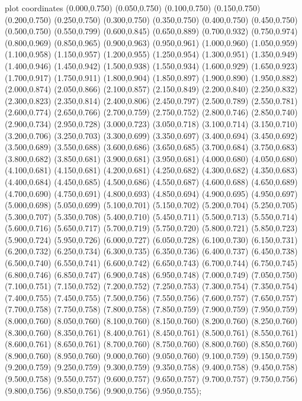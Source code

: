  plot coordinates {(0.000,0.750) (0.050,0.750) (0.100,0.750) (0.150,0.750) (0.200,0.750) (0.250,0.750) (0.300,0.750) (0.350,0.750) (0.400,0.750) (0.450,0.750) (0.500,0.750) (0.550,0.799) (0.600,0.845) (0.650,0.889) (0.700,0.932) (0.750,0.974) (0.800,0.969) (0.850,0.965) (0.900,0.963) (0.950,0.961) (1.000,0.960) (1.050,0.959) (1.100,0.958) (1.150,0.957) (1.200,0.955) (1.250,0.954) (1.300,0.951) (1.350,0.949) (1.400,0.946) (1.450,0.942) (1.500,0.938) (1.550,0.934) (1.600,0.929) (1.650,0.923) (1.700,0.917) (1.750,0.911) (1.800,0.904) (1.850,0.897) (1.900,0.890) (1.950,0.882) (2.000,0.874) (2.050,0.866) (2.100,0.857) (2.150,0.849) (2.200,0.840) (2.250,0.832) (2.300,0.823) (2.350,0.814) (2.400,0.806) (2.450,0.797) (2.500,0.789) (2.550,0.781) (2.600,0.774) (2.650,0.766) (2.700,0.759) (2.750,0.752) (2.800,0.746) (2.850,0.740) (2.900,0.734) (2.950,0.728) (3.000,0.723) (3.050,0.718) (3.100,0.714) (3.150,0.710) (3.200,0.706) (3.250,0.703) (3.300,0.699) (3.350,0.697) (3.400,0.694) (3.450,0.692) (3.500,0.689) (3.550,0.688) (3.600,0.686) (3.650,0.685) (3.700,0.684) (3.750,0.683) (3.800,0.682) (3.850,0.681) (3.900,0.681) (3.950,0.681) (4.000,0.680) (4.050,0.680) (4.100,0.681) (4.150,0.681) (4.200,0.681) (4.250,0.682) (4.300,0.682) (4.350,0.683) (4.400,0.684) (4.450,0.685) (4.500,0.686) (4.550,0.687) (4.600,0.688) (4.650,0.689) (4.700,0.690) (4.750,0.691) (4.800,0.693) (4.850,0.694) (4.900,0.695) (4.950,0.697) (5.000,0.698) (5.050,0.699) (5.100,0.701) (5.150,0.702) (5.200,0.704) (5.250,0.705) (5.300,0.707) (5.350,0.708) (5.400,0.710) (5.450,0.711) (5.500,0.713) (5.550,0.714) (5.600,0.716) (5.650,0.717) (5.700,0.719) (5.750,0.720) (5.800,0.721) (5.850,0.723) (5.900,0.724) (5.950,0.726) (6.000,0.727) (6.050,0.728) (6.100,0.730) (6.150,0.731) (6.200,0.732) (6.250,0.734) (6.300,0.735) (6.350,0.736) (6.400,0.737) (6.450,0.738) (6.500,0.740) (6.550,0.741) (6.600,0.742) (6.650,0.743) (6.700,0.744) (6.750,0.745) (6.800,0.746) (6.850,0.747) (6.900,0.748) (6.950,0.748) (7.000,0.749) (7.050,0.750) (7.100,0.751) (7.150,0.752) (7.200,0.752) (7.250,0.753) (7.300,0.754) (7.350,0.754) (7.400,0.755) (7.450,0.755) (7.500,0.756) (7.550,0.756) (7.600,0.757) (7.650,0.757) (7.700,0.758) (7.750,0.758) (7.800,0.758) (7.850,0.759) (7.900,0.759) (7.950,0.759) (8.000,0.760) (8.050,0.760) (8.100,0.760) (8.150,0.760) (8.200,0.760) (8.250,0.760) (8.300,0.760) (8.350,0.761) (8.400,0.761) (8.450,0.761) (8.500,0.761) (8.550,0.761) (8.600,0.761) (8.650,0.761) (8.700,0.760) (8.750,0.760) (8.800,0.760) (8.850,0.760) (8.900,0.760) (8.950,0.760) (9.000,0.760) (9.050,0.760) (9.100,0.759) (9.150,0.759) (9.200,0.759) (9.250,0.759) (9.300,0.759) (9.350,0.758) (9.400,0.758) (9.450,0.758) (9.500,0.758) (9.550,0.757) (9.600,0.757) (9.650,0.757) (9.700,0.757) (9.750,0.756) (9.800,0.756) (9.850,0.756) (9.900,0.756) (9.950,0.755)};
